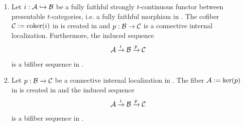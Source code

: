 \documentclass[a4paper,10pt, oneside]{amsart}
\begin{document}
	\begin{prop}\label{shortexactt}
	
		\begin{enumerate}
			\item Let $i:\mathcal{A}\hookrightarrow \mathcal{B}$ be a fully faithful strongly $t$-continuous functor between presentable $t$-categories, i.e. a fully faithful morphism in \prtil. The cofiber $\mathcal{C}:=\mathrm{coker}(i)$ in \prtil is created in \prtrex and $p:\mathcal{B}\to\mathcal{C}$ is a connective internal localization. Furthermore, the induced sequence
			$$\mathcal{A}\xrightarrow{i}\mathcal{B} \xrightarrow{p}\mathcal{C}$$ is a bifiber sequence in \prtil.
			\item Let $p:\mathcal{B}\xrightarrow{} \mathcal{C}$ be a  connective internal localization in \prtil. The fiber $\mathcal{A}:=\ker(p)$ in \prtil is created in \prtrex and the induced sequence
			$$\mathcal{A}\xrightarrow{i}\mathcal{B} \xrightarrow{p}\mathcal{C}$$ is a bifiber sequence in \prtil.
			
		\end{enumerate}
		
	\end{prop}
\end{document}
